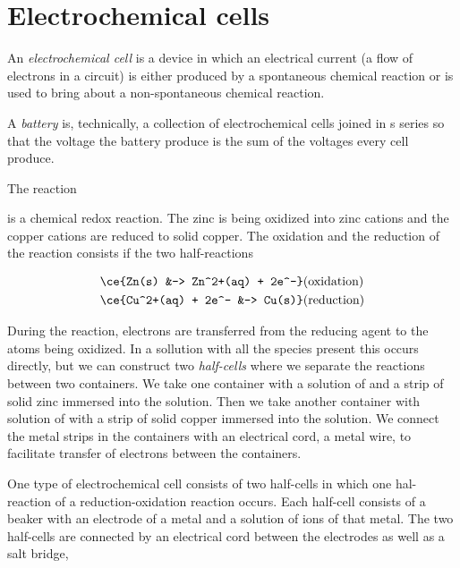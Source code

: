 \documentclass[../mit-general-chemistry.tex]{subfiles}
\begin{document}
\section{Electrochemical cells}


\begin{definition}
  An {\em electrochemical cell} is a device in which an electrical
  current (a flow of electrons in a circuit) is either produced by a
  spontaneous chemical reaction or is used to bring about a
  non-spontaneous chemical reaction.
\end{definition}

\begin{definition}
  A {\em battery} is, technically, a collection of electrochemical
  cells joined in s series so that the voltage the battery produce is
  the sum of the voltages every cell produce.
\end{definition}



The reaction


is a chemical redox reaction. The zinc is being oxidized into zinc
cations and the copper cations are reduced to solid copper. The
oxidation and the reduction of the reaction consists if the two
half-reactions

\begin{align}
  \ce{Zn(s) &-> Zn^2+(aq) + 2e^-} &\text{(oxidation)}\\
  \ce{Cu^2+(aq) + 2e^- &-> Cu(s)} &\text{(reduction)}
\end{align}


During the reaction, electrons are transferred from the reducing agent
to the atoms being oxidized. In a sollution with all the species
present this occurs directly, but we can construct two {\em
  half-cells} where we separate the reactions between two
containers. We take one container with a solution of  and a
strip of solid zinc immersed into the solution. Then we take another
container with solution of  with a strip of solid copper
immersed into the solution. We connect the metal strips in the
containers with an electrical cord, a metal wire, to facilitate
transfer of electrons between the containers.



One type of electrochemical cell consists of two half-cells in which
one hal-reaction of a reduction-oxidation reaction occurs. Each
half-cell consists of a beaker with an electrode of a metal and a
solution of ions of that metal. The two half-cells are connected by an
electrical cord between the electrodes as well as a salt bridge,
\end{document}
